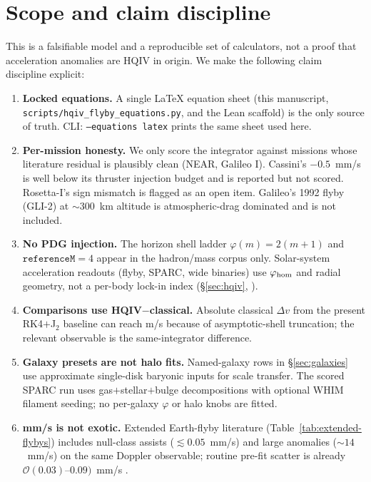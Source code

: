 \documentclass[11pt]{amsart}
\begin{document}
\section{Scope and claim discipline}\label{sec:scope}

This is a falsifiable model and a reproducible set of calculators, not a proof that
acceleration anomalies are HQIV in origin. We make the following claim discipline explicit:

\begin{enumerate}
\item \textbf{Locked equations.} A single LaTeX equation sheet (this manuscript,
\texttt{scripts/hqiv\_flyby\_equations.py}, and the Lean scaffold) is the only source of
truth. CLI: \texttt{--equations latex} prints the same sheet used here.
\item \textbf{Per-mission honesty.} We only score the integrator against missions whose
literature residual is plausibly clean (NEAR, Galileo I). Cassini's $-0.5$~mm/s is well below
its thruster injection budget and is reported but not scored. Rosetta-I's sign mismatch is
flagged as an open item. Galileo's 1992 flyby (GLI-2) at $\sim$300~km altitude is
atmospheric-drag dominated and is not included.
\item \textbf{No PDG injection.} The horizon shell ladder $\varphi(m)=2(m+1)$ and
$\texttt{referenceM}=4$ appear in the hadron/mass corpus only. Solar-system
acceleration readouts (flyby, SPARC, wide binaries) use $\varphi_{\rm hom}$ and
radial geometry, not a per-body lock-in index (\S\ref{sec:hqiv},
\cite{hqiv-kirchhoff-paper}).
\item \textbf{Comparisons use HQIV$-$classical.} Absolute classical $\Delta v$ from the
present RK4$+$J$_2$ baseline can reach m/s because of asymptotic-shell truncation; the
relevant observable is the same-integrator difference.
\item \textbf{Galaxy presets are not halo fits.} Named-galaxy rows in
\S\ref{sec:galaxies} use approximate single-disk baryonic inputs for scale transfer.
The scored SPARC run uses gas$+$stellar$+$bulge decompositions with optional WHIM
filament seeding; no per-galaxy $\varphi$ or halo knobs are fitted.
\item \textbf{mm/s is not exotic.} Extended Earth-flyby literature (Table~\ref{tab:extended-flybys})
includes null-class assists ($\lesssim 0.05$~mm/s) and large anomalies ($\sim 14$~mm/s)
on the same Doppler observable; routine pre-fit scatter is already $\mathcal{O}(0.03)$--$0.09)$~mm/s
\cite{anderson2008,thorne2004doppler}.
\end{enumerate}
\end{document}
